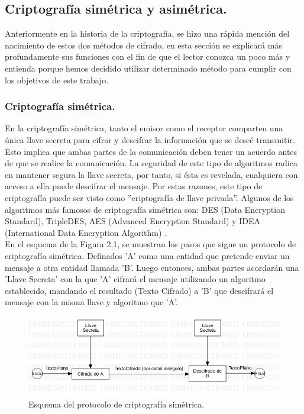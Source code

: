 \documentclass[12pt, a4paper, titlepage]{report}
\begin{document}
            \subsection{Criptografía simétrica y asimétrica.}
                Anteriormente en la historia de la criptografía, se hizo una rápida mención del nacimiento de estos dos métodos de cifrado, en esta sección se explicará más profundamente sus funciones con el fin de que el lector conozca un poco más y entienda porque hemos decidido utilizar determinado método para cumplir con los objetivos de este trabajo.
                
                \subsubsection{Criptografía simétrica.}
                En la criptografía simétrica, tanto el emisor como el receptor comparten una única llave secreta para cifrar y descifrar la información que se deseé transmitir. Esto implica que ambas partes de la comunicación deben tener un acuerdo antes de que se realice la comunicación. La seguridad de este tipo de algoritmos radica en mantener segura la llave secreta, por tanto, si ésta es revelada, cualquiera con acceso a ella puede descifrar el mensaje. Por estas razones, este tipo de criptografía puede ser visto como ''criptografía de llave privada''. Algunos de los algoritmos más famosos de criptografía simétrica son: DES (Data Encryption Standard), TripleDES, AES (Advanced Encryption Standard) y IDEA (International Data Encryption Algorithm) \cite{refCriptografia}.\\
                En el esquema de la Figura 2.1, se muestran los pasos que sigue un protocolo de criptografía simétrica. Definados 'A' como una entidad que pretende enviar un mensaje a otra entidad llamada 'B'. Luego entonces, ambas partes acordarán una 'Llave Secreta' con la que 'A' cifrará el mensaje utilizando un algoritmo establecido, mandando el resultado (Texto Cifrado) a 'B' que descifrará el mensaje con la misma llave y algoritmo que 'A'.
                
                \begin{figure}[H]
        			\begin{center}	                  \includegraphics[width=14cm]{./imagenes/MarcoTeorico/cripto_simetrica.png}
        				\caption{Esquema del protocolo de criptografía simétrica.}
        			\end{center}
        		\end{figure}
        		
\end{document}
